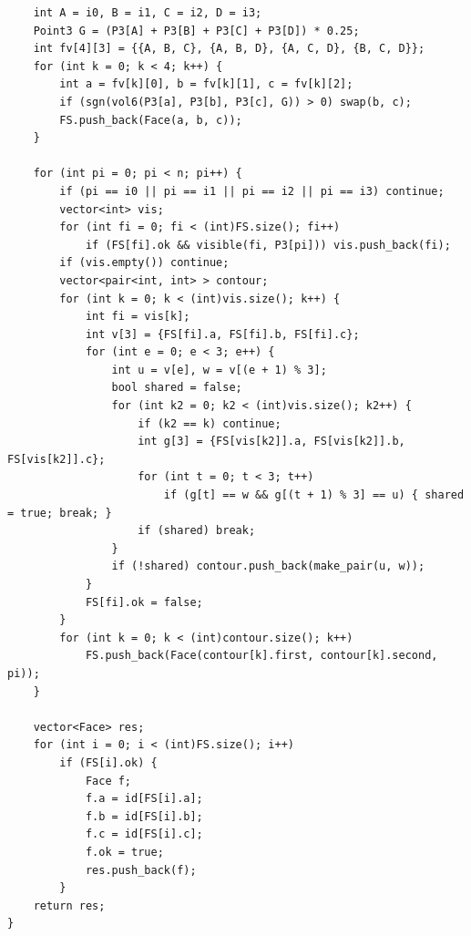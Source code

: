 \documentclass[11pt,a4paper]{ctexart}
\begin{document}
\begin{lstlisting}
    int A = i0, B = i1, C = i2, D = i3;
    Point3 G = (P3[A] + P3[B] + P3[C] + P3[D]) * 0.25;
    int fv[4][3] = {{A, B, C}, {A, B, D}, {A, C, D}, {B, C, D}};
    for (int k = 0; k < 4; k++) {
        int a = fv[k][0], b = fv[k][1], c = fv[k][2];
        if (sgn(vol6(P3[a], P3[b], P3[c], G)) > 0) swap(b, c);
        FS.push_back(Face(a, b, c));
    }

    for (int pi = 0; pi < n; pi++) {
        if (pi == i0 || pi == i1 || pi == i2 || pi == i3) continue;
        vector<int> vis;
        for (int fi = 0; fi < (int)FS.size(); fi++)
            if (FS[fi].ok && visible(fi, P3[pi])) vis.push_back(fi);
        if (vis.empty()) continue;
        vector<pair<int, int> > contour;
        for (int k = 0; k < (int)vis.size(); k++) {
            int fi = vis[k];
            int v[3] = {FS[fi].a, FS[fi].b, FS[fi].c};
            for (int e = 0; e < 3; e++) {
                int u = v[e], w = v[(e + 1) % 3];
                bool shared = false;
                for (int k2 = 0; k2 < (int)vis.size(); k2++) {
                    if (k2 == k) continue;
                    int g[3] = {FS[vis[k2]].a, FS[vis[k2]].b, FS[vis[k2]].c};
                    for (int t = 0; t < 3; t++)
                        if (g[t] == w && g[(t + 1) % 3] == u) { shared = true; break; }
                    if (shared) break;
                }
                if (!shared) contour.push_back(make_pair(u, w));
            }
            FS[fi].ok = false;
        }
        for (int k = 0; k < (int)contour.size(); k++)
            FS.push_back(Face(contour[k].first, contour[k].second, pi));
    }

    vector<Face> res;
    for (int i = 0; i < (int)FS.size(); i++)
        if (FS[i].ok) {
            Face f;
            f.a = id[FS[i].a];
            f.b = id[FS[i].b];
            f.c = id[FS[i].c];
            f.ok = true;
            res.push_back(f);
        }
    return res;
}
\end{lstlisting}
\end{document}
